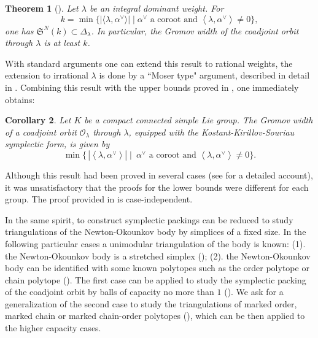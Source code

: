 \documentclass{emsprocart}
\newtheorem{theorem}{Theorem}[section]
\newtheorem{corollary}[theorem]{Corollary}
\theoremstyle{definition}
\begin{document}
\begin{theorem}[\cite{FLP}]\label{Prop:goodordering} Let $\lambda$ be an integral dominant weight.
For 
$$
k=\min\{\vert \langle\lambda,\alpha^\vee\rangle\vert \mid \alpha^{\vee} \textrm{ a  coroot and }\left\langle \lambda,\alpha^{\vee} \right\rangle \neq0\},
$$   
one has $\mathfrak S^N(k)\subset \Delta_\lambda$. In particular, the Gromov width of the coadjoint orbit through $\lambda$ is at least $k$.
\end{theorem}

With standard arguments one can extend this result to rational weights, the 
extension to irrational $\lambda$ is done by a ``Moser type" argument, described in detail in \cite{HP}. 
Combining this result with the upper bounds proved in \cite{CC}, one immediately obtains:

\begin{corollary}\label{corgw}
Let $K$ be a compact connected simple Lie group.
The Gromov width of a coadjoint orbit $\mathcal{O}_\lambda$ through $\lambda$, equipped with the Kostant-Kirillov-Souriau symplectic form, is given by 
\begin{equation}\label{gw formula}
\min\{\, \left|\left\langle \lambda,\alpha^{\vee} \right\rangle \right|\mid \  \alpha^{\vee} \textrm{ a  coroot and }\left\langle \lambda,\alpha^{\vee} \right\rangle \neq0\}.
 \end{equation}
\end{corollary}

Although this result had been proved in several cases (see \cite{FLP} for a detailed account), it was unsatisfactory that the proofs for the lower bounds were different for each group. The proof provided in \cite{FLP} is case-independent.
\par
In the same spirit, to construct symplectic packings can be reduced to study triangulations of the Newton-Okounkov body by simplices of a fixed size. In the following particular cases a unimodular triangulation of the body is known: (1). the Newton-Okounkov body is a stretched simplex (\cite{AKL, K2}); (2). the Newton-Okounkov body can be identified with some known polytopes such as the order polytope or chain polytope (\cite{Sta}). The first case can be applied to study the symplectic packing of the coadjoint orbit by balls of capacity no more than $1$ (\cite{K2}). We ask for a generalization of the second case to study the triangulations of marked order, marked chain or marked chain-order polytopes (\cite{FFMCO}), which can be then applied to the higher capacity cases.
\end{document}
